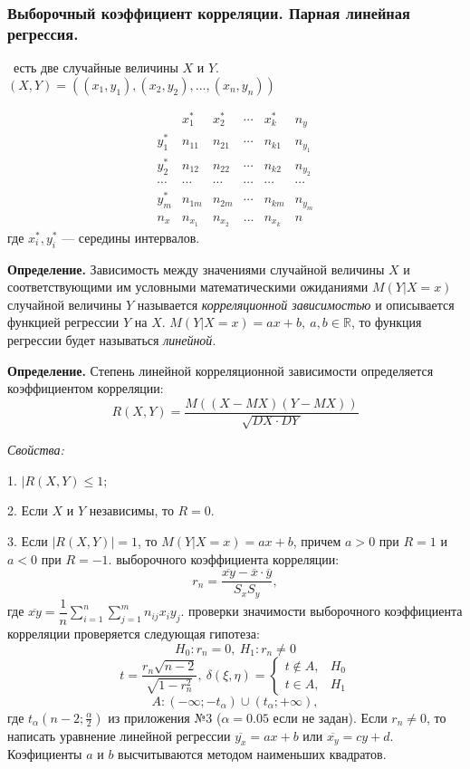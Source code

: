 \documentclass[9pt]{article}
\begin{document}
\subsubsection{Выборочный коэффициент корреляции. Парная линейная регрессия.}

\ 
 есть две случайные величины \(X\) и \(Y\). \((X,Y)=((x_1,y_1),(x_2,y_2),...,(x_n,y_n))\)

\[\begin{array}{c|c|c|c|c|c}
     & x_1^* & x_2^* & \cdots & x_k^* & n_y\\
    \hline
    y_1^* & n_{11} & n_{21} & \cdots & n_{k1} & n_{y_1}\\
    \hline
    y_2^* & n_{12} & n_{22} & \cdots & n_{k2} & n_{y_2}\\
    \hline
    \cdots & \cdots & \cdots & \cdots & \cdots & \cdots \\
    \hline
    y_m^* & n_{1m} & n_{2m} & \cdots & n_{km} & n_{y_m}\\
    \hline
    n_x & n_{x_1} & n_{x_2} & ... & n_{x_k} & n
\end{array}\]
где \(x_i^*,y_i^*\) --- середины интервалов.
\par\textbf{Определение.} Зависимость между значениями случайной величины \(X\) и соответствующими им условными математическими ожиданиями \(M(Y|X=x)\) случайной величины \(Y\) называется \textit{корреляционной зависимостью} и описывается функцией регрессии \(Y\) на \(X\).
\parЕсли \(M(Y|X=x)=ax+b,\ a,b\in\mathbb R\), то функция регрессии будет называться \textit{линейной}.
\par\textbf{Определение.} Степень линейной корреляционной зависимости определяется коэффициентом корреляции:
\[R(X,Y)=\dfrac{M((X-MX)(Y-MX))}{\sqrt{DX\cdot DY}}\]
\par\textit{Свойства:}
\par1. \(|R(X,Y)\le1\);
\par2. Если \(X\) и \(Y\) независимы, то \(R=0\).
\par3. Если \(|R(X,Y)|=1\), то \(M(Y|X=x)=ax+b\), причем \(a>0\) при \(R=1\) и \(a<0\) при \(R=-1\).
\parРеализация выборочного коэффициента корреляции:
\[r_n=\dfrac{\overline{xy}-\overline{x}\cdot\overline{y}}{S_xS_y},\]
где \(\overline{xy}=\dfrac{1}{n}\displaystyle\sum_{i=1}^n\sum_{j=1}^mn_{ij}x_iy_j\).
\parДля проверки значимости выборочного коэффициента корреляции проверяется следующая гипотеза:
\[H_0:r_n=0,\ H_1:r_n\neq0\]
\[t=\dfrac{r_n\sqrt{n-2}}{\sqrt{1-r_n^2}},\ \delta(\xi,\eta)=\left\{\begin{array}{ll}
    t\notin A,&H_0 \\
    t\in A, &H_1 
\end{array}\right.\]
\[A:(-\infty;-t_\alpha)\cup(t_\alpha;+\infty),\]
где \(t_\alpha(n-2;\frac{\alpha}{2})\) из приложения №3 (\(\alpha=0.05\) если не задан). Если \(r_n\neq0\), то написать уравнение линейной регрессии \(\overline{y_x}=ax+b\) или \(\overline{x_y}=cy+d\). Коэфициенты \(a\) и \(b\) высчитываются методом наименьших квадратов.
\end{document}
